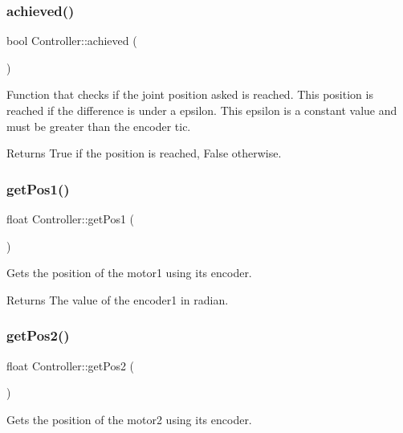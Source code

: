 \subsubsection{\texorpdfstring{achieved()}{achieved()}}
{\footnotesize\ttfamily bool Controller\+::achieved (\begin{DoxyParamCaption}{ }\end{DoxyParamCaption})}



Function that checks if the joint position asked is reached. This position is reached if the difference is under a epsilon. This epsilon is a constant value and must be greater than the encoder tic. 

\begin{DoxyReturn}{Returns}
True if the position is reached, False otherwise. 
\end{DoxyReturn}
\mbox{\label{class_controller_a4c61c7da0184034877c220fd4e956dc6}} 
\subsubsection{\texorpdfstring{getPos1()}{getPos1()}}
{\footnotesize\ttfamily float Controller\+::get\+Pos1 (\begin{DoxyParamCaption}{ }\end{DoxyParamCaption})}



Gets the position of the motor1 using its encoder. 

\begin{DoxyReturn}{Returns}
The value of the encoder1 in radian. 
\end{DoxyReturn}
\mbox{\label{class_controller_a83ab5840be5fa59e1a56397eda27f062}} 
\subsubsection{\texorpdfstring{getPos2()}{getPos2()}}
{\footnotesize\ttfamily float Controller\+::get\+Pos2 (\begin{DoxyParamCaption}{ }\end{DoxyParamCaption})}



Gets the position of the motor2 using its encoder. 

